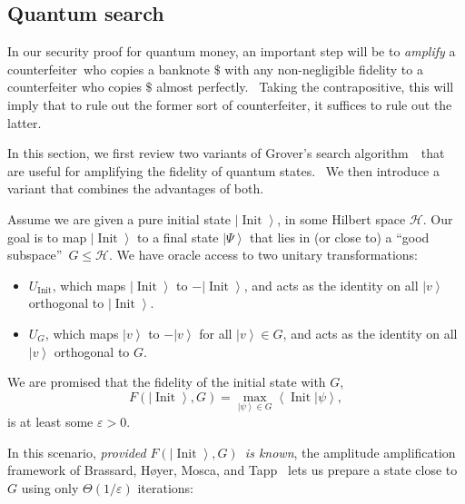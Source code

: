 \subsection{Quantum search\label{SEARCH}}

In our security proof for quantum money, an important step will be to
\emph{amplify} a counterfeiter\ who copies a banknote $\$$ with any
non-negligible fidelity to a counterfeiter who copies $\$$ almost perfectly.
\ Taking the contrapositive, this will imply that to rule out the former sort
of counterfeiter, it suffices to rule out the latter.

In this section, we first review two variants of Grover's search algorithm~\cite{grover}\ that are useful for amplifying the fidelity of quantum states.
\ We then introduce a variant that combines the advantages of both.

Assume we are given a pure initial state $\left\vert \operatorname*{Init}%
\right\rangle $, in some Hilbert space $\mathcal{H}$. Our goal is to map
$\left\vert \operatorname*{Init}\right\rangle $ to a final state $\left\vert
\Psi\right\rangle $ that lies in (or close to) a \textquotedblleft good
subspace\textquotedblright\ $G\leq\mathcal{H}$. We have oracle access to two
unitary transformations:

\begin{itemize}
\item $U_{\operatorname*{Init}}$, which maps $\left\vert \operatorname*{Init}%
\right\rangle $ to $-\left\vert \operatorname*{Init}\right\rangle $, and acts
as the identity on all $\left\vert v\right\rangle $ orthogonal to $\left\vert
\operatorname*{Init}\right\rangle $.

\item $U_{G}$, which maps $\left\vert v\right\rangle $ to $-\left\vert
v\right\rangle $ for all $\left\vert v\right\rangle \in G$, and acts as the
identity on all $\left\vert v\right\rangle $ orthogonal to $G$.
\end{itemize}

We are promised that the fidelity of the initial state with $G$,%
\[
F\left(  \left\vert \operatorname*{Init}\right\rangle ,G\right)
=\max_{\left\vert \psi\right\rangle \in G}\left\langle \operatorname*{Init}%
|\psi\right\rangle ,
\]
is at least some $\varepsilon>0$.

In this scenario, \emph{provided }$F\left(  \left\vert \operatorname*{Init}%
\right\rangle ,G\right)  $\emph{\ is known}, the amplitude amplification
framework of Brassard, H\o yer, Mosca, and Tapp~\cite{bhmt} lets us prepare a
state close to $G$ using only $\Theta(1/\varepsilon)$ iterations:

